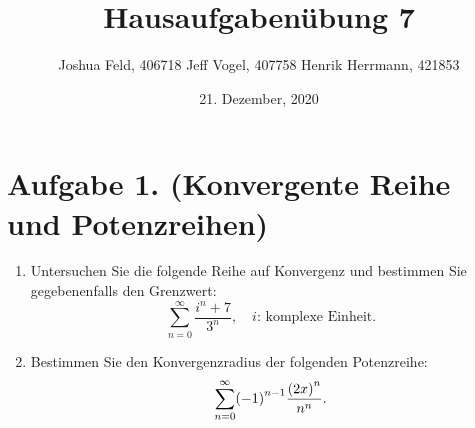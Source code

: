 \documentclass[german,12pt]{homework}
\title{Hausaufgabenübung 7}
\author{Joshua Feld, 406718 \quad Jeff Vogel, 407758 \quad Henrik Herrmann, 421853}
\date{21. Dezember, 2020}
\institute{RWTH Aachen University\\Center for Computational Engineering Science}
\DeclarePairedDelimiter{\enbrace}{(}{)}
\begin{document}
    \maketitle

    \section*{Aufgabe 1. (Konvergente Reihe und Potenzreihen)}

    \begin{problem}
        \begin{enumerate}
            \item Untersuchen Sie die folgende Reihe auf Konvergenz und
            bestimmen Sie gegebenenfalls den Grenzwert:
            \[\sum_{n = 0}^\infty\frac{i^n + 7}{3^n}, \quad i\text{: komplexe
            Einheit}.\]
            \item Bestimmen Sie den Konvergenzradius der folgenden Potenzreihe:
            \[\sum_{n = 0}^\infty\enbrace*{-1}^{n - 1}\frac{\enbrace*{2x}^n}
            {n^n}.\]
        \end{enumerate}
    \end{problem}
\end{document}
